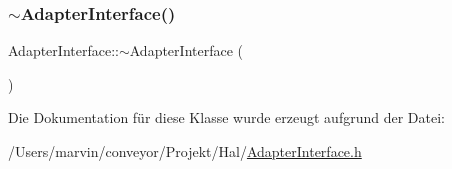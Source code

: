 \hypertarget{class_adapter_interface_a1b1ab479bdaba7c80831d7bb950be7f5}{}\label{class_adapter_interface_a1b1ab479bdaba7c80831d7bb950be7f5} 
\subsubsection{\texorpdfstring{$\sim$\+Adapter\+Interface()}{~AdapterInterface()}}
{\footnotesize\ttfamily Adapter\+Interface\+::$\sim$\+Adapter\+Interface (\begin{DoxyParamCaption}{ }\end{DoxyParamCaption})}



Die Dokumentation für diese Klasse wurde erzeugt aufgrund der Datei\+:\begin{DoxyCompactItemize}
\item 
/\+Users/marvin/conveyor/\+Projekt/\+Hal/\hyperlink{_adapter_interface_8h}{Adapter\+Interface.\+h}\end{DoxyCompactItemize}
